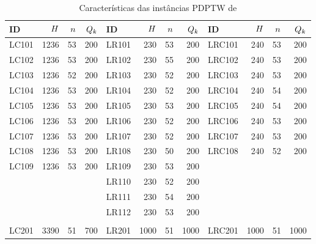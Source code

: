\begin{table}[H]
\footnotesize
    \centering
    \caption{Características das instâncias PDPTW de 
             \textcite{li_metaheuristic_2003}}
    \label{tab:li_metaheuristics_2003_PDPTW_instances_characteristics}
    \begin{tabular}{lrrr|lrrr|lrrr}
        \toprule  
        ID & $H$ & $n$ & $Q_{k}$ & 
        ID & $H$ & $n$ & $Q_{k}$ & 
        ID & $H$ & $n$ & $Q_{k}$ \\ 
        \midrule
        LC101      & 1236 &  53 & 200 & LR101      &  230 &  53 &  200 & LRC101      &  240 &  53 &  200\\
        LC102      & 1236 &  53 & 200 & LR102      &  230 &  55 &  200 & LRC102      &  240 &  53 &  200\\
        LC103      & 1236 &  52 & 200 & LR103      &  230 &  52 &  200 & LRC103      &  240 &  53 &  200\\
        LC104      & 1236 &  53 & 200 & LR104      &  230 &  52 &  200 & LRC104      &  240 &  54 &  200\\
        LC105      & 1236 &  53 & 200 & LR105      &  230 &  53 &  200 & LRC105      &  240 &  54 &  200\\
        LC106      & 1236 &  53 & 200 & LR106      &  230 &  52 &  200 & LRC106      &  240 &  53 &  200\\
        LC107      & 1236 &  53 & 200 & LR107      &  230 &  52 &  200 & LRC107      &  240 &  53 &  200\\
        LC108      & 1236 &  53 & 200 & LR108      &  230 &  50 &  200 & LRC108      &  240 &  52 &  200\\
        LC109      & 1236 &  53 & 200 & LR109      &  230 &  53 &  200 &             &      &     &     \\ 
                   &      &     &     & LR110      &  230 &  52 &  200 &             &      &     &     \\ 
                   &      &     &     & LR111      &  230 &  54 &  200 &             &      &     &     \\
                   &      &     &     & LR112      &  230 &  53 &  200 &             &      &     &     \\
                   &      &     &     &            &      &     &      &             &      &     &     \\
        LC201      & 3390 &  51 & 700 & LR201      & 1000 &  51 & 1000 & LRC201      & 1000 &  51 & 1000\\

\end{tabular}
\end{table}
